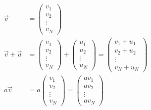 \documentclass[a4paper]{report}
\begin{document}
\begin{align}
\vec{v} &= \begin{pmatrix}v_1 \\ v_2 \\ \vdots \\ v_N\end{pmatrix}\\[1.5em]
\vec{v} + \vec{u} &= \begin{pmatrix}v_1 \\ v_2 \\ \vdots \\ v_N\end{pmatrix} + \begin{pmatrix}u_1 \\ u_2 \\ \vdots \\ u_N\end{pmatrix} = \begin{pmatrix}v_1 + u_1 \\ v_2 + u_2 \\ \vdots \\ v_N + u_N\end{pmatrix} \\[1.5em]
a\vec{v} & = a \begin{pmatrix}v_1 \\ v_2 \\ \vdots \\ v_N\end{pmatrix} = \begin{pmatrix}a v_1 \\ a v_2 \\ \vdots \\ a v_N\end{pmatrix}
\end{align}
\end{document}
